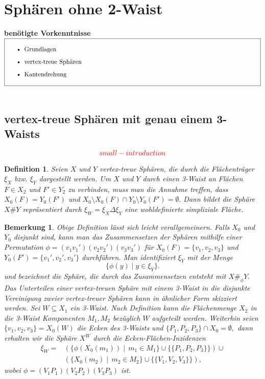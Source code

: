 \documentclass[12pt,titlepage,twoside,cleardoublepage]{article}
\theoremstyle{nummermitklammern}
\newtheorem{definition}[temp]{Definition}
\newtheorem{bemerkung}[temp]{Bemerkung}
\newtheorem{definition}[zahl]{Definition}
\newtheorem{bemerkung}[zahl]{Bemerkung}
\numberwithin{equation}{section}
\begin{document}
 \section{Sphären ohne 2-Waist}
 \textbf{benötigte Vorkenntnisse}\\
$\fbox{
\parbox{14cm}{\begin{itemize}
\item Grundlagen 
\item vertex-treue Sph\"aren
\item Kantendrehung
\end{itemize}
}}$\\\\

\subsection{vertex-treue Sphären mit genau einem 3-Waists}
\[
\textcolor{red}{small-introduction}
\]
\begin{definition}
Seien $X$ und $Y$ vertex-treue Sphären, die durch die Flächenträger $\xi_X$ bzw. $\xi_Y$ dargestellt werden. Um $X$ und $Y$ durch einen 3-Waist an Flächen $F\in X_2$ und $F'\in Y_2$ zu verbinden, muss man die Annahme treffen, dass
$X_0(F)=Y_0(F')$ und $X_0\setminus X_0(F)\cap Y_0\setminus Y_0(F')=\emptyset.$ Dann bildet die Sphäre $X\#Y$ repräsentiert durch $\xi_W=\xi_X \Delta \xi_Y$ eine wohldefinierte simpliziale Fläche.
\end{definition}
\begin{bemerkung}\label{3waist}
Obige Definition lässt sich leicht verallgemeinern. Falls $X_0$ und $Y_0$ disjunkt sind, kann man das Zusammensetzen der Sphären mithilfe einer Permutation $\phi=(v_1v_1')(v_2v_2')(v_3v_3')$ für $X_0(F)=\{v_1,v_2,v_3\}$ und $Y_0(F')=\{v_1',v_2',v_3'\}$ durchführen. Man identifiziert $\xi_Y$ mit der Menge  
\[
\{\phi (y)\mid y\in \xi_Y \}.
\]
und bezeichnet die Sphäre, die durch das Zusammensetzen  entsteht mit $X\#_{\phi}Y.$\\
Das Unterteilen einer vertex-treuen Sphäre mit einem 3-Waist in die disjunkte Vereinigung zweier vertex-treuer Sphären kann in ähnlicher Form skizziert werden. Sei $W\subseteq X_1$ ein 3-Waist. Nach Definition  kann die Flächenmenge $X_2$ in die 3-Waist Komponenten $M_1,M_2$ bezüglich $W$ aufgeteilt werden. Weiterhin seien $\{v_1,v_2,v_3\}=X_0(W)$ die Ecken des 3-Waists und $\{P_1,P_2,P_3\}\cap X_0=\emptyset,$ dann erhalten wir die Sphäre $X^W$ durch die Ecken-Flächen-Inzidenzen 
\begin{align*}
\xi_W=&(\{\phi(X_0(m_1))\mid \, m_1\in M_1\}\cup \{\{P_1,P_2,P_3\}\}) \cup\\
 &(\{X_0(m_2)\mid \, m_2\in M_2\}\cup \{\{V_1,V_2,V_3\}\}),
\end{align*}
wobei $\phi=(V_1P_1)(V_2P_2)(V_3P_3)$ ist.
\end{bemerkung}
\end{document}
